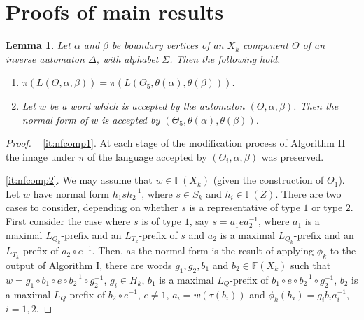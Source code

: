 \documentclass[a4paper,12pt]{article}
\renewcommand{\a}{\alpha }
\renewcommand{\b}{\beta }
\newcommand{\D}{\Delta }
\newcommand{\T}{\Theta }
\renewcommand{\S}{\Sigma }
\renewcommand{\t}{\tau }
\newtheorem{lemma}[theorem]{Lemma}
\numberwithin{equation}{section}
\numberwithin{figure}{section}
\newcommand{\FF}{\ensuremath{\mathbb{F}}}
\newcommand{\be}{\begin{enumerate}}
\newcommand{\ee}{\end{enumerate}}
\begin{document}
\section{Proofs of main results}
\begin{lemma}\label{lem:nfcomp}
Let $\a$ and $\b$ be boundary vertices of  an $X_k$ component $\T$ of
an inverse automaton $\D$, with alphabet $\S$. Then   the following hold.
\be
\item\label{it:nfcomp1}
  $\pi(L(\T,\a,\b))=\pi(L(\T_5,\theta(\a),\theta(\b)))$.
\item\label{it:nfcomp2} Let $w$ be a word
 which is accepted by the automaton $(\T, \a, \b)$. Then the
normal form of $w$ is accepted by $(\T_5, \theta(\a), \theta(\b))$.
\ee
\end{lemma}
\begin{proof} ~
\ref{it:nfcomp1}.
At each stage of the modification process of Algorithm
II the image under $\pi$ of the language accepted by $(\T_i,\a,\b)$  was
preserved.

\ref{it:nfcomp2}.
We may assume that $w\in \FF(X_k)$ (given the construction of $\T_1$).
Let $w$ have normal form $h_1s h_2^{-1}$, where $s\in S_k$ and $h_i\in \FF(Z)$.
There are two cases to consider, depending on whether $s$ is a
representative of type $1$ or type $2$.
 First consider the case where $s$ is of type $1$, say
 $s= a_1 e a_2^{-1}$, where
$a_1$ is a maximal $L_{Q_k}$-prefix and an $L_{T_k}$-prefix of $s$ and
 $a_2$  is a maximal $L_{Q_k}$-prefix and an $L_{T_k}$-prefix of $a_2\circ e^{-1}$.
 Then, as the normal form is the result of applying $\phi_k$ to the
output of Algorithm I,
 there are words
$g_1, g_2, b_1$ and $b_2\in \FF(X_k)$ such that
$w=g_1\circ b_1\circ e \circ b_2^{-1}\circ g_2^{-1}$,
$g_i\in H_k$, $b_1$ is a maximal $L_Q$-prefix of
$b_1\circ e \circ b_2^{-1}\circ g_2^{-1}$,
$b_2$ is a maximal $L_Q$-prefix of $b_2\circ e^{-1}$, $e\neq 1$,
$a_i=w(\t(b_i))$ and $\phi_k(h_i)=g_ib_ia_i^{-1}$, $i=1,2$.


\end{proof}
\end{document}
